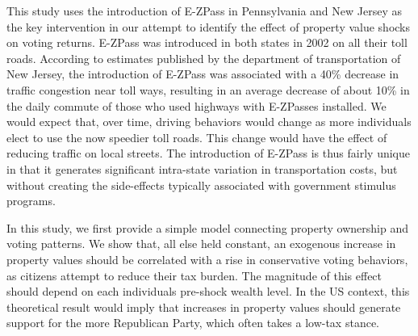\documentclass[11.0pt]{article}
\theoremstyle{definition}
\begin{document}
This study uses the introduction of E-ZPass in Pennsylvania and New Jersey as the key intervention in our attempt to identify the effect of property value shocks on voting returns. E-ZPass was introduced in both states in 2002 on all their toll roads. According to estimates published by the department of transportation of New Jersey, the introduction of E-ZPass was associated with a 40\% decrease in traffic congestion near toll ways, resulting in an average decrease of about 10\% in the daily commute of those who used highways with E-ZPasses installed. We would expect that, over time, driving behaviors would change as more individuals elect to use the now speedier toll roads. This change would have the effect of reducing traffic on local streets. The introduction of E-ZPass is thus fairly unique in that it generates significant intra-state variation in transportation costs, but without creating the side-effects typically associated with government stimulus programs. 

In this study, we first provide a simple model connecting property ownership and voting patterns. We show that, all else held constant, an exogenous increase in property values should be correlated with a rise in conservative voting behaviors, as citizens attempt to reduce their tax burden. The magnitude of this effect should depend on each individuals pre-shock wealth level. In the US context, this theoretical result would imply that increases in property values should generate support for the more Republican Party, which often takes a low-tax stance.
\end{document}
